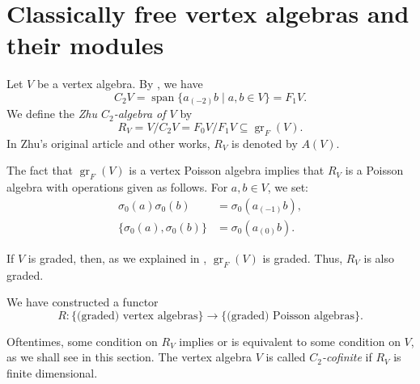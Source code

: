 \documentclass[a4paper, 12pt, reqno]{amsart}
\theoremstyle{remark}
\DeclareMathOperator{\gr}{gr}
\DeclareMathOperator{\vspan}{span}
\begin{document}
\section{Classically free vertex algebras and their modules}
\label{sec:class-free-vert}

Let $V$ be a vertex algebra.
By , we have
\begin{equation*}
  C_2V = \vspan\{a_{(-2)}b \mid a, b \in V\} = F_1V.
\end{equation*}
We define the \emph{Zhu $C_2$-algebra of $V$} by
\begin{equation*}
  R_V = V/C_2V = F_0V/F_1V \subseteq \gr_F(V).
\end{equation*}
In Zhu's original article \cite{zhu_modular_1996} and other works, $R_V$ is denoted by $A(V)$.

The fact that $\gr_F(V)$ is a vertex Poisson algebra implies that $R_V$ is a Poisson algebra with operations given as follows.
For $a, b \in V$, we set:
\begin{align*}
  \sigma_0(a)\sigma_0(b) &= \sigma_0(a_{(-1)}b), \\
  \{\sigma_0(a), \sigma_0(b)\} &= \sigma_0(a_{(0)}b).
\end{align*}

If $V$ is graded, then, as we explained in , $\gr_F(V)$ is graded.
Thus, $R_V$ is also graded.

We have constructed a functor
\begin{equation*}
  R: \{\text{(graded) vertex algebras}\} \to \{\text{(graded) Poisson algebras}\}.
\end{equation*}

Oftentimes, some condition on $R_V$ implies or is equivalent to some condition on $V$, as we shall see in this section.
The vertex algebra $V$ is called \emph{$C_2$-cofinite} if $R_V$ is finite dimensional.
\end{document}
